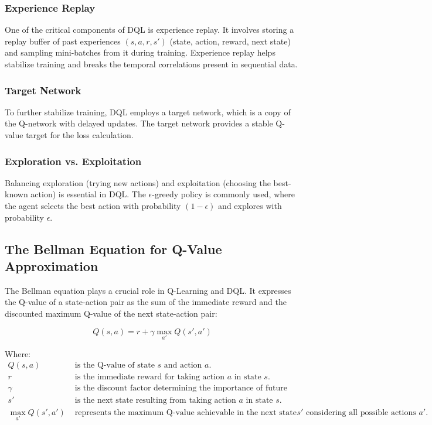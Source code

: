 \documentclass{scrartcl}
\begin{document}
\subsubsection{Experience Replay}

One of the critical components of DQL is experience replay. It involves storing a replay buffer of past experiences $(s, a, r, s')$ (state, action, reward, next state) and sampling mini-batches from it during training. Experience replay helps stabilize training and breaks the temporal correlations present in sequential data.

\subsubsection{Target Network}

To further stabilize training, DQL employs a target network, which is a copy of the Q-network with delayed updates. The target network provides a stable Q-value target for the loss calculation.

\subsubsection{Exploration vs. Exploitation}

Balancing exploration (trying new actions) and exploitation (choosing the best-known action) is essential in DQL. The $\epsilon$-greedy policy is commonly used, where the agent selects the best action with probability $(1-\epsilon)$ and explores with probability $\epsilon$.

\subsection{The Bellman Equation for Q-Value Approximation}

The Bellman equation plays a crucial role in Q-Learning and DQL. It expresses the Q-value of a state-action pair as the sum of the immediate reward and the discounted maximum Q-value of the next state-action pair:

\[
Q(s, a) = r + \gamma \max_{a'} Q(s', a')
\]

Where:
\begin{align*}
Q(s, a) & \text{ is the Q-value of state }s\text{ and action }a. \\
r & \text{ is the immediate reward for taking action }a\text{ in state }s. \\
\gamma & \text{ is the discount factor determining the importance of future rewards.} \\
s' & \text{ is the next state resulting from taking action }a\text{ in state }s. \\
\max_{a'} Q(s', a') & \text{ represents the maximum Q-value achievable in the next state }s'\text{ considering all possible actions }a'.
\end{align*}
\end{document}
